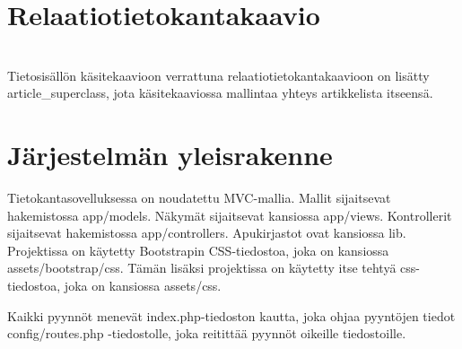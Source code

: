 \documentclass[12pt]{article}
\begin{document}
  \section{Relaatiotietokantakaavio}
         \\
        Tietosisällön käsitekaavioon verrattuna relaatiotietokantakaavioon on lisätty article\_superclass, jota käsitekaaviossa mallintaa yhteys artikkelista itseensä.
  \newpage

  \section{Järjestelmän yleisrakenne}
        Tietokantasovelluksessa on noudatettu MVC-mallia. Mallit sijaitsevat hakemistossa app/models. Näkymät sijaitsevat kansiossa app/views. Kontrollerit sijaitsevat hakemistossa app/controllers. Apukirjastot ovat kansiossa lib. Projektissa on käytetty Bootstrapin CSS-tiedostoa, joka on kansiossa assets/bootstrap/css. Tämän lisäksi projektissa on käytetty itse tehtyä css-tiedostoa, joka on kansiossa assets/css.

        Kaikki pyynnöt menevät index.php-tiedoston kautta, joka ohjaa pyyntöjen tiedot config/routes.php -tiedostolle, joka reitittää pyynnöt oikeille tiedostoille.
\end{document}
